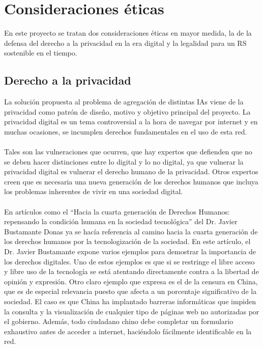 \chapter{Consideraciones éticas}
\thispagestyle{fancy}

En este proyecto se tratan dos consideraciones éticas en mayor medida, la de la defensa del derecho a la privacidad en la era digital y la legalidad para un RS sostenible en el tiempo.

\section{Derecho a la privacidad}

La solución propuesta al problema de agregación de distintas IAs viene de la privacidad como patrón de diseño, motivo y objetivo principal del proyecto. La privacidad digital es un tema controversial a la hora de navegar por internet y en muchas ocasiones, se incumplen derechos fundamentales en el uso de esta red.
\\\\
Tales son las vulneraciones que ocurren, que hay expertos que defienden que no se deben hacer distinciones entre lo digital y lo no digital, ya que vulnerar la privacidad digital es vulnerar el derecho humano de la privacidad. Otros expertos creen que es necesaria una nueva generación de los derechos humanos que incluya los problemas inherentes de vivir en una sociedad digital.
\\\\
En artículos como el “Hacia la cuarta generación de Derechos Humanos: repensando la condición humana en la sociedad tecnológica”\autocite{donasHACIACUARTAGENERACION} del Dr. Javier Bustamante Donas ya se hacía referencia al camino hacia la cuarta generación de los derechos humanos por la tecnologización de la sociedad. En este artículo, el Dr. Javier Bustamante expone varios ejemplos para demostrar la importancia de los derechos digitales. Uno de estos ejemplos es que si se restringe el libre acceso y libre uso de la tecnología se está atentando directamente contra a la libertad de opinión y expresión. Otro claro ejemplo que expresa es el de la censura en China, que es de especial relevancia puesto que afecta a un porcentaje significativo de la sociedad. El caso es que China ha implantado barreras informáticas que impiden la consulta y la visualización de cualquier tipo de páginas web no autorizadas por el gobierno. Además, todo ciudadano chino debe completar un formulario exhaustivo antes de acceder a internet, haciéndolo fácilmente identificable en la red.
